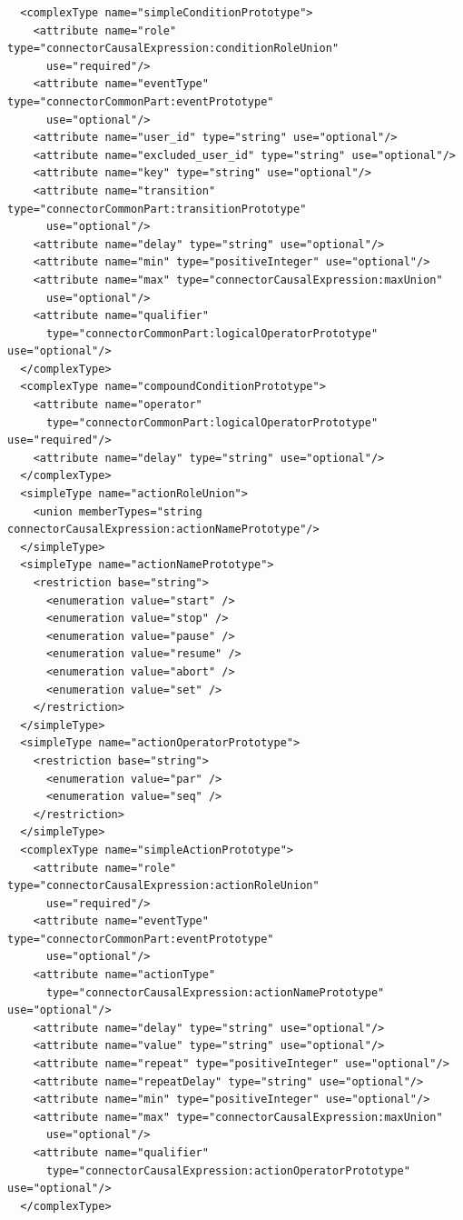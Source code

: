 \documentclass[
  doutorado,
  american
]{ThesisPUC}
\begin{document}
\begin{listing}[t]
\begin{verbatim}
  <complexType name="simpleConditionPrototype">
    <attribute name="role" type="connectorCausalExpression:conditionRoleUnion" 
      use="required"/>
    <attribute name="eventType" type="connectorCommonPart:eventPrototype" 
      use="optional"/>
    <attribute name="user_id" type="string" use="optional"/>
    <attribute name="excluded_user_id" type="string" use="optional"/>
    <attribute name="key" type="string" use="optional"/>
    <attribute name="transition" type="connectorCommonPart:transitionPrototype" 
      use="optional"/>
    <attribute name="delay" type="string" use="optional"/>
    <attribute name="min" type="positiveInteger" use="optional"/>
    <attribute name="max" type="connectorCausalExpression:maxUnion" 
      use="optional"/>
    <attribute name="qualifier" 
      type="connectorCommonPart:logicalOperatorPrototype" use="optional"/>
  </complexType>
  <complexType name="compoundConditionPrototype">
    <attribute name="operator" 
      type="connectorCommonPart:logicalOperatorPrototype" use="required"/>
    <attribute name="delay" type="string" use="optional"/>
  </complexType>
  <simpleType name="actionRoleUnion">
    <union memberTypes="string connectorCausalExpression:actionNamePrototype"/>
  </simpleType>
  <simpleType name="actionNamePrototype">
    <restriction base="string">
      <enumeration value="start" />
      <enumeration value="stop" />
      <enumeration value="pause" />
      <enumeration value="resume" />
      <enumeration value="abort" />
      <enumeration value="set" />
    </restriction>
  </simpleType>
  <simpleType name="actionOperatorPrototype">
    <restriction base="string">
      <enumeration value="par" />
      <enumeration value="seq" />
    </restriction>
  </simpleType>
  <complexType name="simpleActionPrototype">
    <attribute name="role" type="connectorCausalExpression:actionRoleUnion"     
      use="required"/>
    <attribute name="eventType" type="connectorCommonPart:eventPrototype" 
      use="optional"/>
    <attribute name="actionType"
      type="connectorCausalExpression:actionNamePrototype" use="optional"/>
    <attribute name="delay" type="string" use="optional"/>
    <attribute name="value" type="string" use="optional"/>
    <attribute name="repeat" type="positiveInteger" use="optional"/>
    <attribute name="repeatDelay" type="string" use="optional"/>
    <attribute name="min" type="positiveInteger" use="optional"/>
    <attribute name="max" type="connectorCausalExpression:maxUnion" 
      use="optional"/>
    <attribute name="qualifier" 
      type="connectorCausalExpression:actionOperatorPrototype" use="optional"/>
  </complexType>
  
\end{verbatim}
\end{listing}
\end{document}
